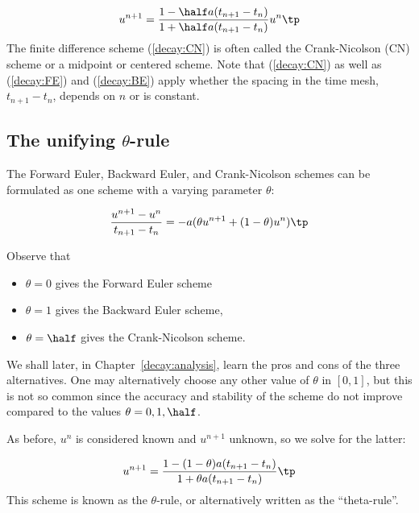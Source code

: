 \documentclass[graybox,sectrefs,envcountresetchap,open=right,final]{svmonodo}
\begin{document}
\begin{equation}
u^{n+1} = \frac{1-\half a(t_{n+1}-t_n)}{1 + \half a(t_{n+1}-t_n)}u^n\tp
\label{decay:CN}
\end{equation}
The finite difference scheme (\ref{decay:CN}) is often called
the Crank-Nicolson (CN) scheme or a midpoint or centered scheme.
Note that (\ref{decay:CN}) as well as (\ref{decay:FE}) and (\ref{decay:BE})
apply whether the spacing in the time mesh, $t_{n+1}-t_n$, depends on $n$
or is constant.

\subsection{The unifying $\theta$-rule}
\label{decay:schemes:theta}

  

The Forward Euler, Backward Euler, and Crank-Nicolson schemes can be
formulated as one scheme with a varying parameter $\theta$:

\begin{equation}
\frac{u^{n+1}-u^{n}}{t_{n+1}-t_n} = -a (\theta u^{n+1} + (1-\theta) u^{n})
\label{decay:th0}
\tp
\end{equation}

Observe that

\begin{itemize}
 \item $\theta =0$ gives the Forward Euler scheme

 \item $\theta =1$ gives the Backward Euler scheme,

 \item $\theta =\half$ gives the Crank-Nicolson scheme.
\end{itemize}

\noindent
We shall later, in Chapter~\ref{decay:analysis}, learn the pros and cons
of the three alternatives.
One may alternatively choose any other value of $\theta$ in $[0,1]$, but
this is not so common since the accuracy and stability of
the scheme do not improve compared
to the values $\theta=0,1,\half$.

As before, $u^n$ is considered known and $u^{n+1}$ unknown, so
we solve for the latter:

\begin{equation}
u^{n+1} = \frac{1 - (1-\theta) a(t_{n+1}-t_n)}{1 + \theta a(t_{n+1}-t_n)}\tp
\label{decay:th}
\end{equation}
This scheme is known as the $\theta$-rule, or alternatively written as
the ``theta-rule''.
\end{document}
